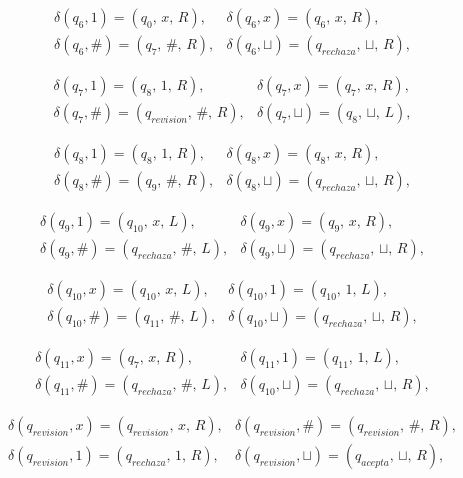 \documentclass{article}
\begin{document}
\begin{enumerate}
\[
\begin{array}{ll}
\delta(q_6,1)       = (q_0,\,x,\,R), &
\delta(q_6,x)       = (q_6,\,x,\,R),\\[4pt]
\delta(q_6,\#)      = (q_7,\,\#,\,R), &
\delta(q_6,\sqcup)  = (q_{rechaza},\,\sqcup,\,R),
\end{array}
\]

\[
\begin{array}{ll}
\delta(q_7,1)       = (q_8,\,1,\,R), &
\delta(q_7,x)       = (q_7,\,x,\,R),\\[4pt]
\delta(q_7,\#)      = (q_{revision},\,\#,\,R), &
\delta(q_7,\sqcup)  = (q_8,\,\sqcup,\,L),
\end{array}
\]

\[
\begin{array}{ll}
\delta(q_8,1)       = (q_8,\,1,\,R), &
\delta(q_8,x)       = (q_8,\,x,\,R),\\[4pt]
\delta(q_8,\#)      = (q_9,\,\#,\,R), &
\delta(q_8,\sqcup)  = (q_{rechaza},\,\sqcup,\,R),
\end{array}
\]

\[
\begin{array}{ll}
\delta(q_9,1)       = (q_{10},\,x,\,L), &
\delta(q_9,x)       = (q_9,\,x,\,R),\\[4pt]
\delta(q_9,\#)      = (q_{rechaza},\,\#,\,L), &
\delta(q_9,\sqcup)  = (q_{rechaza},\,\sqcup,\,R),
\end{array}
\]

\[
\begin{array}{ll}
\delta(q_{10},x)    = (q_{10},\,x,\,L), &
\delta(q_{10},1)    = (q_{10},\,1,\,L),\\[4pt]
\delta(q_{10},\#)   = (q_{11},\,\#,\,L), &
\delta(q_{10},\sqcup)=(q_{rechaza},\,\sqcup,\,R),
\end{array}
\]

\[
\begin{array}{ll}
\delta(q_{11},x)    = (q_{7},\,x,\,R), &
\delta(q_{11},1)    = (q_{11},\,1,\,L),\\[4pt]
\delta(q_{11},\#)   = (q_{rechaza},\,\#,\,L), &
\delta(q_{10},\sqcup)=(q_{rechaza},\,\sqcup,\,R),
\end{array}
\]

\[
\begin{array}{ll}
\delta(q_{revision},x)    = (q_{revision},\,x,\,R), &
\delta(q_{revision},\#)   = (q_{revision},\,\#,\,R),\\[4pt]
\delta(q_{revision},1)    = (q_{rechaza},\,1,\,R), &
\delta(q_{revision},\sqcup)= (q_{acepta},\,\sqcup,\,R),
\end{array}
\]


\end{enumerate}
\end{document}
